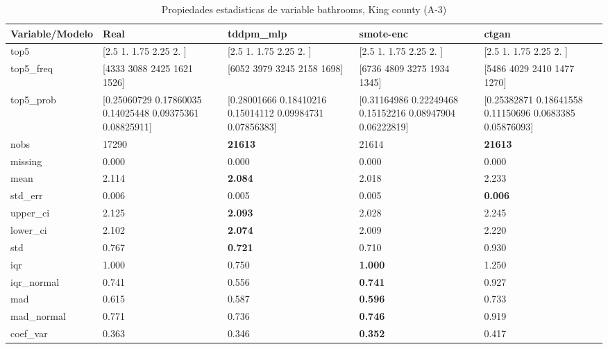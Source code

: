 \begin{table}[H]
\centering
\fontsize{8}{14}\selectfont
\caption{Propiedades  estadisticas de variable bathrooms, King county (A-3)}
\label{table-stats-king county-a-3-bathrooms}
\begin{tabular}{|l|m{10em}|m{10em}|m{10em}|m{10em}|}
\hline
 \rowcolor[gray]{0.8}
Variable/Modelo & Real & tddpm\_mlp & smote-enc & ctgan \\
\hline top5 & [2.5  1.   1.75 2.25 2.  ] & [2.5  1.   1.75 2.25 2.  ] & [2.5  1.   1.75 2.25 2.  ] & [2.5  1.   1.75 2.25 2.  ] \\
\hline top5\_freq & [4333 3088 2425 1621 1526] & [6052 3979 3245 2158 1698] & [6736 4809 3275 1934 1345] & [5486 4029 2410 1477 1270] \\
\hline top5\_prob & [0.25060729 0.17860035 0.14025448 0.09375361 0.08825911] & [0.28001666 0.18410216 0.15014112 0.09984731 0.07856383] & [0.31164986 0.22249468 0.15152216 0.08947904 0.06222819] & [0.25382871 0.18641558 0.11150696 0.0683385  0.05876093] \\
\hline nobs & 17290 & \bfseries 21613 & \cellcolor[rgb]{0.9, 0.54, 0.52} 21614 & \bfseries 21613 \\
\hline missing & 0.000 & 0.000 & 0.000 & 0.000 \\
\hline mean & 2.114 & \bfseries 2.084 & 2.018 & \cellcolor[rgb]{0.9, 0.54, 0.52} 2.233 \\
\hline std\_err & 0.006 & 0.005 & \cellcolor[rgb]{0.9, 0.54, 0.52} 0.005 & \bfseries 0.006 \\
\hline upper\_ci & 2.125 & \bfseries 2.093 & 2.028 & \cellcolor[rgb]{0.9, 0.54, 0.52} 2.245 \\
\hline lower\_ci & 2.102 & \bfseries 2.074 & 2.009 & \cellcolor[rgb]{0.9, 0.54, 0.52} 2.220 \\
\hline std & 0.767 & \bfseries 0.721 & 0.710 & \cellcolor[rgb]{0.9, 0.54, 0.52} 0.930 \\
\hline iqr & 1.000 & \cellcolor[rgb]{0.9, 0.54, 0.52} 0.750 & \bfseries 1.000 & \cellcolor[rgb]{0.9, 0.54, 0.52} 1.250 \\
\hline iqr\_normal & 0.741 & \cellcolor[rgb]{0.9, 0.54, 0.52} 0.556 & \bfseries 0.741 & \cellcolor[rgb]{0.9, 0.54, 0.52} 0.927 \\
\hline mad & 0.615 & 0.587 & \bfseries 0.596 & \cellcolor[rgb]{0.9, 0.54, 0.52} 0.733 \\
\hline mad\_normal & 0.771 & 0.736 & \bfseries 0.746 & \cellcolor[rgb]{0.9, 0.54, 0.52} 0.919 \\
\hline coef\_var & 0.363 & 0.346 & \bfseries 0.352 & \cellcolor[rgb]{0.9, 0.54, 0.52} 0.417 \\

\end{tabular}
\end{table}
